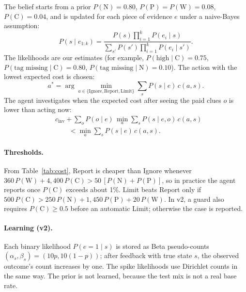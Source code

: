 \documentclass{article}
\newcommand{\Pc}{P(\mathrm{C})}
\begin{document}
The belief starts from a prior $P(\mathrm{N}) = 0.80$, $P(\mathrm{P}) = P(\mathrm{W}) = 0.08$, $\Pc = 0.04$, and is updated for each piece of evidence $e$ under a naive-Bayes assumption:
\begin{equation}
P(s \mid e_{1:k}) = \frac{P(s)\prod_{i=1}^{k} P(e_i \mid s)}{\sum_{s'} P(s')\prod_{i=1}^{k} P(e_i \mid s')}.
\end{equation}
The likelihoods are our estimates (for example, $P(\text{high} \mid \mathrm{C}) = 0.75$, $P(\text{tag missing} \mid \mathrm{C}) = 0.80$, $P(\text{tag missing} \mid \mathrm{N}) = 0.10$). The action with the lowest expected cost is chosen:
\begin{equation}
a^{*} = \arg\min_{a \in \{\mathrm{Ignore},\mathrm{Report},\mathrm{Limit}\}} \sum_{s} P(s \mid e)\, c(a, s).
\end{equation}
The agent investigates when the expected cost after seeing the paid clues $o$ is lower than acting now:
\begin{equation}
\begin{split}
& c_{\mathrm{inv}} + \sum_{o} P(o \mid e)\, \min_{a} \sum_{s} P(s \mid e, o)\, c(a,s) \\
& \qquad < \min_{a} \sum_{s} P(s \mid e)\, c(a,s).
\end{split}
\end{equation}

\paragraph{Thresholds.} From Table~\ref{tab:cost}, Report is cheaper than Ignore whenever $360\,P(\mathrm{W}) + 4{,}400\,\Pc > 50\,[P(\mathrm{N}) + P(\mathrm{P})]$, so in practice the agent reports once $\Pc$ exceeds about 1\%. Limit beats Report only if $500\,\Pc > 250\,P(\mathrm{N}) + 1{,}450\,P(\mathrm{P}) + 20\,P(\mathrm{W})$. In v2, a guard also requires $\Pc \geq 0.5$ before an automatic Limit; otherwise the case is reported.

\paragraph{Learning (v2).} Each binary likelihood $P(e{=}1 \mid s)$ is stored as Beta pseudo-counts $(\alpha_s, \beta_s) = (10p, 10(1{-}p))$; after feedback with true state $s$, the observed outcome's count increases by one. The spike likelihoods use Dirichlet counts in the same way. The prior is not learned, because the test mix is not a real base rate.
\end{document}
